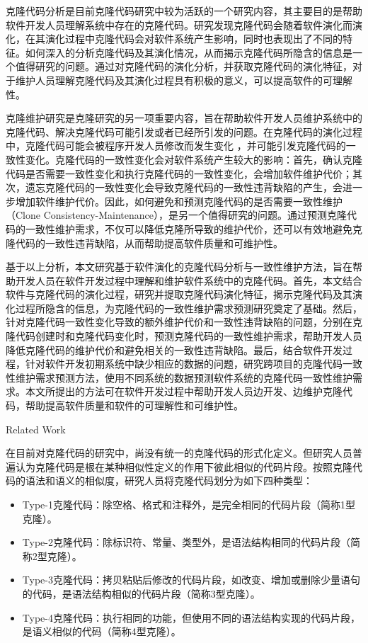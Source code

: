 克隆代码分析是目前克隆代码研究中较为活跃的一个研究内容，其主要目的是帮助软件开发人员理解系统中存在的克隆代码。研究发现克隆代码会随着软件演化而演化\cite{kim2005empirical,saha2011automatic}，在其演化过程中克隆代码会对软件系统产生影响，同时也表现出了不同的特征\cite{gode2011frequency,mondal2012dispersion,rahman2014change}。如何深入的分析克隆代码及其演化情况，从而揭示克隆代码所隐含的信息是一个值得研究的问题。通过对克隆代码的演化分析，并获取克隆代码的演化特征，对于维护人员理解克隆代码及其演化过程具有积极的意义，可以提高软件的可理解性。

克隆维护研究是克隆研究的另一项重要内容，旨在帮助软件开发人员维护系统中的克隆代码、解决克隆代码可能引发或者已经所引发的问题。在克隆代码的演化过程中，克隆代码可能会被程序开发人员修改而发生变化 ，并可能引发克隆代码的一致性变化\cite{krinke2007study,aversano2007clones}。克隆代码的一致性变化会对软件系统产生较大的影响：首先，确认克隆代码是否需要一致性变化和执行克隆代码的一致性变化，会增加软件维护代价；其次，遗忘克隆代码的一致性变化会导致克隆代码的一致性违背缺陷的产生\cite{juergens2009code,wagner2016relationship}，会进一步增加软件维护代价。因此，如何避免和预测克隆代码的是否需要一致性维护（Clone Consistency-Maintenance），是另一个值得研究的问题。通过预测克隆代码的一致性维护需求，不仅可以降低克隆所导致的维护代价，还可以有效地避免克隆代码的一致性违背缺陷，从而帮助提高软件质量和可维护性。

基于以上分析，本文研究基于软件演化的克隆代码分析与一致性维护方法，旨在帮助开发人员在软件开发过程中理解和维护软件系统中的克隆代码。首先，本文结合软件与克隆代码的演化过程，研究并提取克隆代码演化特征，揭示克隆代码及其演化过程所隐含的信息，为克隆代码的一致性维护需求预测研究奠定了基础。然后，针对克隆代码一致性变化导致的额外维护代价和一致性违背缺陷的问题，分别在克隆代码创建时和克隆代码变化时，预测克隆代码的一致性维护需求，帮助开发人员降低克隆代码的维护代价和避免相关的一致性违背缺陷。最后，结合软件开发过程，针对软件开发初期系统中缺少相应的数据的问题，研究跨项目的克隆代码一致性维护需求预测方法，使用不同系统的数据预测软件系统的克隆代码一致性维护需求。本文所提出的方法可在软件开发过程中帮助开发人员边开发、边维护克隆代码，帮助提高软件质量和软件的可理解性和可维护性。


{Related Work}

在目前对克隆代码的研究中，尚没有统一的克隆代码的形式化定义。但研究人员普遍认为克隆代码是根在某种相似性定义的作用下彼此相似的代码片段\cite{roy2007survey}。按照克隆代码的语法和语义的相似度，研究人员将克隆代码划分为如下四种类型\cite{koschke2007survey}：
\begin{itemize}
\item 
Type-1克隆代码：除空格、格式和注释外，是完全相同的代码片段（简称1型克隆）。
\item 
Type-2克隆代码：除标识符、常量、类型外，是语法结构相同的代码片段（简称2型克隆）。
\item 
Type-3克隆代码：拷贝粘贴后修改的代码片段，如改变、增加或删除少量语句的代码，是语法结构相似的代码片段（简称3型克隆）。
\item 
Type-4克隆代码：执行相同的功能，但使用不同的语法结构实现的代码片段，是语义相似的代码（简称4型克隆）。
\end{itemize}

